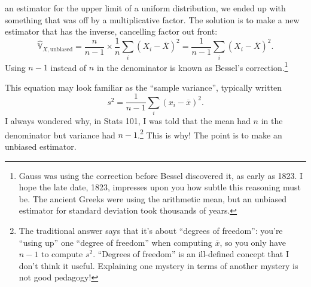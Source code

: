 an estimator for the upper limit of a uniform distribution, we ended up with
something that was off by a multiplicative factor. The solution is to make a new
estimator that has the inverse, cancelling factor out front:
\begin{equation}
\hat{\mathbb{V}}_{X,\mathrm{unbiased}}
  = \frac{n}{n-1} \times \frac{1}{n} \sum_i \left(X_i - \overline{X}\right)^2
  = \frac{1}{n-1} \sum_i \left(X_i - \overline{X}\right)^2.
\end{equation}
Using $n-1$ instead of $n$ in the denominator is known as Bessel's
correction.\footnote{Gauss was using the correction before Bessel discovered
it, as early as 1823. I hope the late date, 1823, impresses upon you how
subtle this reasoning must be. The ancient Greeks were using the arithmetic
mean, but an unbiased estimator for standard deviation took thousands of
years.}

This equation may look familiar as the ``sample variance'', typically written
\begin{equation}
s^2 = \frac{1}{n-1} \sum_i \left(x_i - \overline{x}\right)^2.
\end{equation}
I always wondered why, in Stats 101, I was told that the mean had $n$ in the
denominator but variance had $n-1$.\footnote{The traditional answer says that it's
about ``degrees of freedom'': you're ``using up'' one ``degree of freedom''
when computing $\overline{x}$, so you only have $n-1$ to compute $s^2$.
``Degrees of freedom'' is an ill-defined concept that I don't think it useful.
Explaining one mystery in terms of another mystery is not good pedagogy!}
This is why! The point is to make an unbiased estimator.

